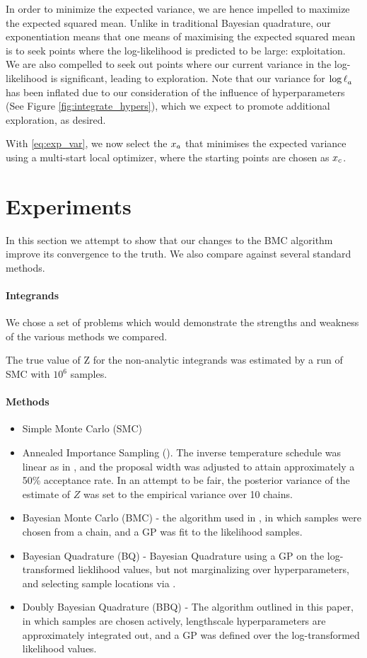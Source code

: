 \documentclass{article}
\begin{document}
In order to minimize the expected variance, we are hence impelled to maximize the expected squared mean. Unlike in traditional Bayesian quadrature, our exponentiation means that one means of maximising the expected squared mean is to seek points where the log-likelihood is predicted to be large: exploitation. We are also compelled to seek out points where our current variance in the log-likelihood is significant, leading to exploration. Note that our variance for $\tr_a$ has been inflated due to our consideration of the influence of hyperparameters (See Figure \ref{fig:integrate_hypers}), which we expect to promote additional exploration, as desired.

With \eqref{eq:exp_var}, we now select the $\lfv_a$ that minimises the expected variance using a multi-start local optimizer, where the starting points are chosen as $\lfv_c$. 




\section{Experiments}
\label{sec:experiments}
In this section we attempt to show that our changes to the BMC algorithm improve its convergence to the truth.  We also compare against several standard  methods.
\paragraph{Integrands}
We chose a set of problems which would demonstrate the strengths and weakness of the various methods we compared.

The true value of Z for the non-analytic integrands was estimated by a run of SMC with $10^6$ samples.
\paragraph{Methods}
\begin{itemize}
\item Simple Monte Carlo (SMC)
\item Annealed Importance Sampling ().  The inverse temperature schedule was linear as in \citep{BZMonteCarlo}, and the proposal width was adjusted to attain approximately a 50\% acceptance rate.  In an attempt to be fair, the posterior variance of the  estimate of $Z$ was set to the empirical variance over 10 chains.
\item Bayesian Monte Carlo (BMC) - the algorithm used in \citep{BZMonteCarlo}, in which samples were chosen from a  chain, and a GP was fit to the likelihood samples.
\item Bayesian Quadrature (BQ) - Bayesian Quadrature using a GP on the log-transformed lieklihood values, but not marginalizing over hyperparameters, and selecting sample locations via .
\item Doubly Bayesian Quadrature (BBQ) - The algorithm outlined in this paper, in which samples are chosen actively, lengthscale hyperparameters are approximately integrated out, and a GP was defined over the log-transformed likelihood values.
\end{itemize}
\end{document}

